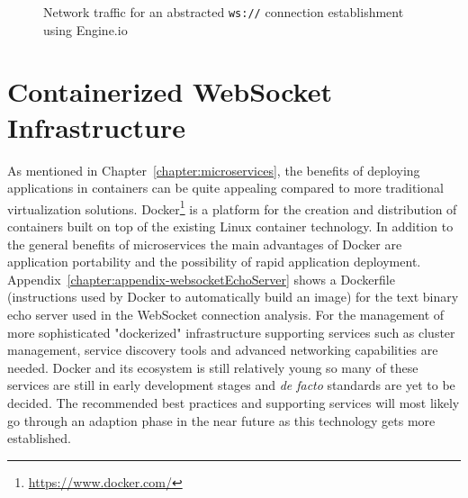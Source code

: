 \begin{figure}[h!]
	\centering
	\caption{Network traffic for an abstracted \texttt{ws://} connection establishment using Engine.io}
	\label{fig:engineioTraffic}
\end{figure}

\section{Containerized WebSocket Infrastructure}

As mentioned in Chapter~\ref{chapter:microservices}, the benefits of deploying applications in containers can be quite appealing compared to more traditional virtualization solutions. Docker\footnote{\url{https://www.docker.com/}} is a platform for the creation and distribution of containers built on top of the existing Linux container technology. In addition to the general benefits of microservices the main advantages of Docker are application portability and the possibility of rapid application deployment. Appendix~\ref{chapter:appendix-websocketEchoServer} shows a Dockerfile (instructions used by Docker to automatically build an image) for the text binary echo server used in the WebSocket connection analysis. For the management of more sophisticated "dockerized" infrastructure supporting services such as cluster management, service discovery tools and advanced networking capabilities are needed. Docker and its ecosystem is still relatively young so many of these services are still in early development stages and \textit{de facto} standards are yet to be decided. The recommended best practices and supporting services will most likely go through an adaption phase in the near future as this technology gets more established.


